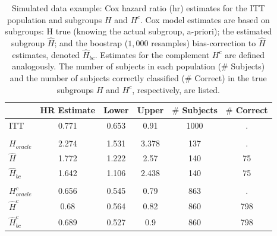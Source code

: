 \documentclass[smallextended]{svjour3}
\begin{document}
\begin{table}

\caption{\label{tab:simex_tab}\label{tab:simex} Simulated data example: Cox hazard ratio (hr) estimates for the ITT population and subgroups $H$ and $H^{c}$.
Cox model estimates are based on subgroups: H true (knowing the actual subgroup, a-priori); the estimated subgroup $\hat{H}$; and 
the boostrap ($1,000$ resamples) bias-correction to $\hat{H}$ estimates, denoted $\hat{H}_{bc}$.  Estimates for the complement $H^{c}$ are defined analogously.
The number of subjects in each population ($\#$ Subjects) and the number of subjects correctly classified ($\#$ Correct) in the true subgroups $H$ and $H^{c}$, respectively, are listed.}
\centering
\fontsize{9}{11}\selectfont
\begin{tabular}[t]{lccccc}
\toprule
  & HR Estimate & Lower & Upper & $\#$ Subjects & $\#$ Correct\\
\midrule
ITT & 0.771 & 0.653 & 0.91 & 1000 & .\\
\addlinespace[0.3em]
\multicolumn{6}{l}{\textbf{H subgroup estimates}}\\
\hspace{1em}$H_{oracle}$ & 2.274 & 1.531 & 3.378 & 137 & .\\
\hspace{1em}$\hat{H}$ & 1.772 & 1.222 & 2.57 & 140 & 75\\
\hspace{1em}$\hat{H}_{bc}$ & 1.642 & 1.106 & 2.438 & 140 & 75\\
\addlinespace[0.3em]
\multicolumn{6}{l}{\textbf{H-complement subgroup estimates}}\\
\hspace{1em}$H^{c}_{oracle}$ & 0.656 & 0.545 & 0.79 & 863 & .\\
\hspace{1em}$\hat{H}^{c}$ & 0.68 & 0.564 & 0.82 & 860 & 798\\
\hspace{1em}$\hat{H}^{c}_{bc}$ & 0.689 & 0.527 & 0.9 & 860 & 798\\
\bottomrule
\end{tabular}
\end{table}





\end{document}

